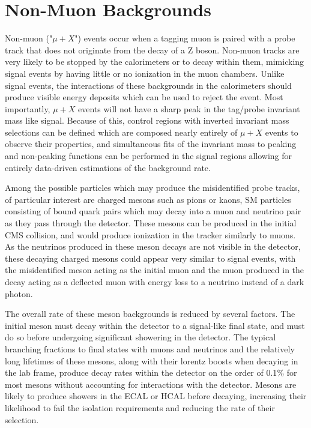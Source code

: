 \section{Non-Muon Backgrounds}
Non-muon ("$\mu+X$") events occur when a tagging muon is paired with a probe track that does not originate from the decay of a Z boson. 
Non-muon tracks are very likely to be stopped by the calorimeters or to decay within them, mimicking signal events by having little or no ionization in the muon chambers. 
Unlike signal events, the interactions of these backgrounds in the calorimeters should produce visible energy deposits which can be used to reject the event.
Most importantly, $\mu+X$ events will not have a sharp peak in the tag/probe invariant mass like signal.
Because of this, control regions with inverted invariant mass selections can be defined which are composed nearly entirely of $\mu+X$ events to observe their properties, and simultaneous fits of the invariant mass to peaking and non-peaking functions can be performed in the signal regions allowing for entirely data-driven estimations of the background rate.

Among the possible particles which may produce the misidentified probe tracks, of particular interest are charged mesons such as pions or kaons, SM particles consisting of bound quark pairs which may decay into a muon and neutrino pair as they pass through the detector.
These mesons can be produced in the initial CMS collision, and would produce ionization in the tracker similarly to muons.
As the neutrinos produced in these meson decays are not visible in the detector, these decaying charged mesons could appear very similar to signal events, with the misidentified meson acting as the initial muon and the muon produced in the decay acting as a deflected muon with energy loss to a neutrino instead of a dark photon.

The overall rate of these meson backgrounds is reduced by several factors.
The initial meson must decay within the detector to a signal-like final state, and must do so before undergoing significant showering in the detector.
The typical branching fractions to final states with muons and neutrinos and the relatively long lifetimes of these mesons, along with their lorentz boosts when decaying in the lab frame, produce decay rates within the detector on the order of 0.1$\%$ for most mesons without accounting for interactions with the detector.
Mesons are likely to produce showers in the ECAL or HCAL before decaying, increasing their likelihood to fail the isolation requirements and reducing the rate of their selection.

